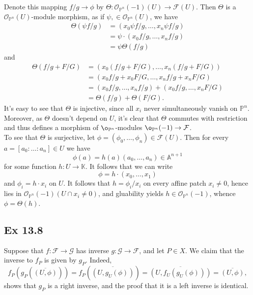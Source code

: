 \documentclass{article}
\theoremstyle{definition}
\newcommand{\K}{\mathbb{K}}
\renewcommand{\P}{\mathbb{P}}
\newcommand{\A}{\mathbb{A}}
\newcommand{\Ano}{\A^{n + 1}}
\newcommand{\Pn}{\P^n}
\begin{document}
Denote this mapping $f/g \to \phi$ by $\Theta : \mathcal{O}_{\Pn}(-1)(U) \to
\mathcal{F}(U)$. Then $\Theta$ is a $\mathcal{O}_{\Pn}(U)$-module morphism, as
if $\psi, \in \mathcal{O}_{\Pn}(U)$, we have 
\begin{align*}
	\Theta(\psi f/g)
	&=
	(x_0 \psi f/g, \ldots, x_n \psi f/g) \\
	&=
	\psi \cdot (x_0 f/g, \ldots, x_n f/g) \\
	&=
	\psi \Theta(f/g)
\end{align*}
and 
\begin{align*}
	\Theta(f/g + F/G)
	&=
	(x_0 (f/g + F/G), \ldots, x_n (f/g + F/G)) \\
	&=
	(x_0 f/g + x_0 F/G, \ldots, x_n f/g + x_n F/G) \\
	&=
	(x_0 f/g, \ldots, x_n f/g)
	+
	(x_0 f/g, \ldots, x_n F/G) \\
	&=
	\Theta(f/g)
	+
	\Theta(F/G).
\end{align*}
It's easy to see that $\Theta$ is injective, since all $x_i$ never
simultaneously vanish on $\Pn$. Moreover, as $\Theta$ doesn't depend on $U$,
it's clear that $\Theta$ commutes with restriction and thus defines a morphism
of $\o_{\Pn}$-modules $\o_{\Pn}(-1) \to \mathcal{F}$. \\

To see that $\Theta$ is surjective, let $\phi = (\phi_0, \ldots, \phi_n) \in
\mathcal{F}(U)$. Then for every $a = [a_0 : \ldots : a_n] \in U$ we have 
\[
	\phi(a) = h(a)(a_0, \ldots, a_n) \in \Ano
\] 
for some function $h : U \to \K$. It follows that we can write 
\[
	\phi = h \cdot (x_0, \ldots, x_1)
\] 
and $\phi_i = h \cdot x_i$ on $U$. It follows that $h = \phi_i / x_i$ on every
affine patch $x_i \not = 0$, hence lies in $\mathcal{O}_{\Pn}(-1)(U \cap x_i
\not = 0)$, and gluability yields  $h \in \mathcal{O}_{\Pn}(-1)$, whence 
$\phi = \Theta(h)$.


\subsection*{Ex 13.8}

Suppose that $f : \mathcal{F} \to \mathcal{G}$ has inverse $g : \mathcal{G} \to
\mathcal{F}$, and let $P \in X$. We claim that the inverse to $f_P$ is given by
$g_P$. Indeed,
\[
	f_P(g_P(\overline{(U, \phi)}))
	=
	f_P(\overline{(U, g_U(\phi))})
	=
	\overline{(U, f_U(g_U(\phi)))}
	=
	\overline{(U, \phi)},
\] 
shows that $g_P$ is a right inverse, and the proof that it is a left inverse is
identical. \\
\end{document}
